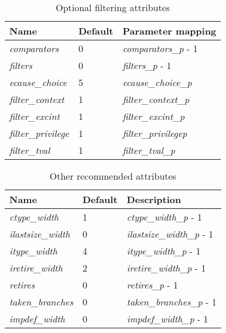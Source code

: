 \begin{table}[!h]
    \centering
    \caption{Optional filtering attributes}
    \label{tab:optionalAttributes}
    \begin{tabulary}{\textwidth}{|l|l|p{80mm}|}
        \hline
        \textbf{Name} & \textbf{Default} & \textbf{Parameter mapping} \\
        \hline
         \textit{comparators} & 0 & \textit{comparators\_p} - 1\\
        \hline
        \textit{filters} & 0 & \textit{filters\_p} - 1\\
        \hline
        \textit{ecause\_choice} & 5 & \textit{ecause\_choice\_p}\\
        \hline
        \textit{filter\_context} & 1 & \textit{filter\_context\_p}\\
        \hline
        \textit{filter\_excint} & 1 & \textit{filter\_excint\_p}\\
        \hline
        \textit{filter\_privilege} & 1 & \textit{filter\_privilege\-p}\\
        \hline
        \textit{filter\_tval} & 1 & \textit{filter\_tval\_p}\\
        \hline
    \end{tabulary}
\end{table}

\begin{table}[!h]
    \centering
    \caption{Other recommended attributes}
    \label{tab:otherAttributes}
    \begin{tabulary}{\textwidth}{|l|l|p{80mm}|}
        \hline
        \textbf{Name} & \textbf{Default} & \textbf{Description} \\
        \hline
        \textit{ctype\_width} & 1 & \textit{ctype\_width\_p} - 1\\
        \hline
        \textit{ilastsize\_width} & 0 & \textit{ilastsize\_width\_p} - 1\\
        \hline
        \textit{itype\_width} & 4 & \textit{itype\_width\_p} - 1\\
        \hline
        \textit{iretire\_width} & 2 & \textit{iretire\_width\_p} - 1\\
        \hline
        \textit{retires} & 0 & \textit{retires\_p} - 1\\
        \hline
        \textit{taken\_branches} & 0 & \textit{taken\_branches\_p} - 1\\
        \hline
        \textit{impdef\_width} & 0 & \textit{impdef\_width\_p} - 1\\
        \hline
    \end{tabulary}
\end{table}

